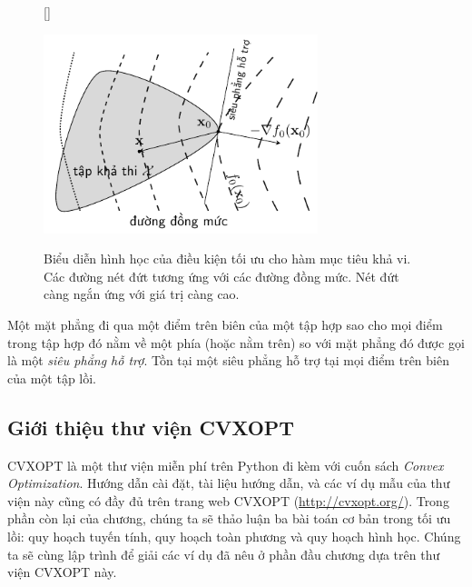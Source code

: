 \begin{figure}[t]    %
[\FBwidth]
{\caption{Biểu diễn hình học của điều kiện tối ưu cho hàm mục tiêu khả vi.
Các đường nét đứt tương ứng với các đường đồng mức. Nét đứt càng ngắn ứng với giá trị càng cao.}
\label{fig:17_optimalitycondition}}
{\includegraphics[width=8cm]{Chapters/08_ConvexOptimization/17_convexopt/latex/optimalitycondition_gray.pdf}}
\end{figure}

Một mặt phẳng đi qua một điểm trên biên của một tập hợp sao cho mọi điểm trong
tập hợp đó nằm về một phía (hoặc nằm trên) so với mặt phẳng đó được gọi là
một \textit{siêu phẳng hỗ trợ}. Tồn tại một siêu phẳng hỗ trợ tại mọi điểm trên biên của một tập lồi.


\subsection{Giới thiệu thư viện CVXOPT}
CVXOPT là một thư viện miễn phí trên Python đi kèm với cuốn sách \textit{Convex
Optimization}. Hướng dẫn cài đặt, tài liệu hướng dẫn, và các ví dụ mẫu của thư
viện này cũng có đầy đủ trên trang web CVXOPT (\url{http://cvxopt.org/}). Trong
phần còn lại của chương, chúng ta sẽ thảo luận ba bài toán cơ bản trong tối ưu lồi: quy hoạch tuyến tính, quy hoạch toàn phương và quy hoạch hình học. Chúng ta sẽ cùng lập trình để giải các ví dụ đã nêu ở phần đầu chương dựa trên thư viện CVXOPT này.


